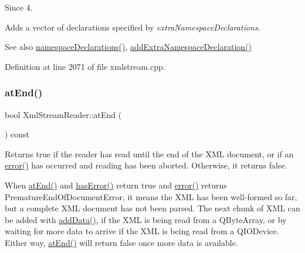 \begin{DoxySince}{Since}
4.
\end{DoxySince}
Adds a vector of declarations specified by {\itshape extra\+Namespace\+Declarations}.

\begin{DoxySeeAlso}{See also}
\hyperlink{class_xml_stream_reader_a3e6033d64f3744d90e96287f3a04d913}{namespace\+Declarations()}, \hyperlink{class_xml_stream_reader_a6c6b71cc9f62ad5c1b85c207ba1be850}{add\+Extra\+Namespace\+Declaration()} 
\end{DoxySeeAlso}


Definition at line 2071 of file xmlstream.\+cpp.

\mbox{\label{class_xml_stream_reader_a4acf0ba0ea25300b66c9d85ba3e8dfb3}} 
\subsubsection{\texorpdfstring{at\+End()}{atEnd()}}
{\footnotesize\ttfamily bool Xml\+Stream\+Reader\+::at\+End (\begin{DoxyParamCaption}{ }\end{DoxyParamCaption}) const}

Returns {\ttfamily true} if the reader has read until the end of the X\+ML document, or if an \hyperlink{class_xml_stream_reader_ae9a7e8fe9f15b0f5c4ec5fa080c6249f}{error()} has occurred and reading has been aborted. Otherwise, it returns {\ttfamily false}.

When \hyperlink{class_xml_stream_reader_a4acf0ba0ea25300b66c9d85ba3e8dfb3}{at\+End()} and \hyperlink{class_xml_stream_reader_a26bc2d6831322e5a1d86182295f912d0}{has\+Error()} return true and \hyperlink{class_xml_stream_reader_ae9a7e8fe9f15b0f5c4ec5fa080c6249f}{error()} returns Premature\+End\+Of\+Document\+Error, it means the X\+ML has been well-\/formed so far, but a complete X\+ML document has not been parsed. The next chunk of X\+ML can be added with \hyperlink{class_xml_stream_reader_add6baa0f8790fc528c1fa6e05755f96b}{add\+Data()}, if the X\+ML is being read from a Q\+Byte\+Array, or by waiting for more data to arrive if the X\+ML is being read from a Q\+I\+O\+Device. Either way, \hyperlink{class_xml_stream_reader_a4acf0ba0ea25300b66c9d85ba3e8dfb3}{at\+End()} will return false once more data is available.

